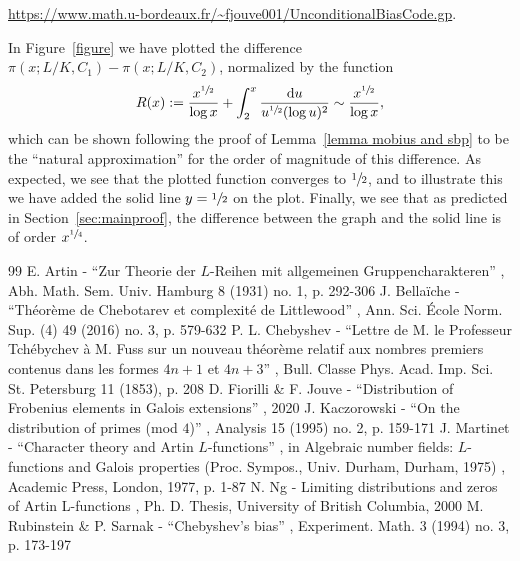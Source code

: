 \documentclass[10pt]{amsart}
\theoremstyle{definition}
\renewcommand{\d}{\mathrm{d}}
\begin{document}
\noindent
\url{https://www.math.u-bordeaux.fr/~fjouve001/UnconditionalBiasCode.gp}.

\noindent
In Figure~\ref{figure} we have plotted the difference $\pi(x;L/K,C_1) -\pi(x;L/K,C_2)$, normalized by the function
\[R(x):= \frac {x^{\sfrac 12}}{\log x}+ \int_2^{x} \frac{\d u}{u^{\sfrac 12} (\log u)^2}\sim \frac {x^{\sfrac 12}}{\log x},\]
which can be shown following the proof of Lemma~\ref{lemma mobius and sbp} to be the ``natural approximation'' for the order of magnitude of this difference. As expected, we see that the plotted function converges to $\sfrac 12$, and to illustrate this we have added the solid line $y=\sfrac 12$ on the plot. Finally, we see that as predicted in Section~\ref{sec:mainproof}, the difference between the graph and the solid line is of order $x^{\sfrac 14}$.



\begin{thebibliography}{99}
 E. Artin - “Zur Theorie der $L$-Reihen mit allgemeinen Gruppencharakteren” , Abh. Math. Sem. Univ. Hamburg 8 (1931) no. 1, p. 292-306
 J. Bellaïche - “Théorème de Chebotarev et complexité de Littlewood” , Ann. Sci. École Norm. Sup. (4) 49 (2016) no. 3, p. 579-632
 P. L. Chebyshev - “Lettre de M. le Professeur Tchébychev à M. Fuss sur un nouveau théorème relatif aux nombres premiers contenus dans les formes $4n + 1$ et $4n + 3$” , Bull. Classe Phys. Acad. Imp. Sci. St. Petersburg 11 (1853), p. 208
 D. Fiorilli \& F. Jouve - “Distribution of Frobenius elements in Galois extensions” , 2020
 J. Kaczorowski - “On the distribution of primes (mod $4$)” , Analysis 15 (1995) no. 2, p. 159-171
 J. Martinet - “Character theory and Artin $L$-functions” , in Algebraic number fields: $L$-functions and Galois properties (Proc. Sympos., Univ. Durham, Durham, 1975) , Academic Press, London, 1977, p. 1-87
 N. Ng - Limiting distributions and zeros of Artin L-functions , Ph. D. Thesis, University of British Columbia, 2000
 M. Rubinstein \& P. Sarnak - “Chebyshev’s bias” , Experiment. Math. 3 (1994) no. 3, p. 173-197
\end{thebibliography}
\end{document}
